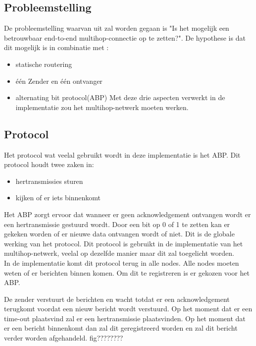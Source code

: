\documentclass{article}
\begin{document}
\subsection{Probleemstelling}
De probleemstelling waarvan uit zal worden gegaan is "Is het mogelijk een betrouwbaar end-to-end multihop-connectie op te zetten?". De hypothese is dat dit mogelijk is in combinatie met :
\\
\begin{itemize}
	\item statische routering
	\item \'{e}\'{e}n Zender en \'{e}\'{e}n ontvanger
	\item alternating bit protocol(ABP)
	Met deze drie aspecten verwerkt in de implementatie zou het multihop-netwerk moeten werken. 
\end{itemize}
\subsection{Protocol}
Het protocol wat veelal gebruikt wordt in deze implementatie is het ABP. Dit protocol houdt twee zaken in:
\\
\begin{itemize}
	\item hertransmissies sturen
	\item kijken of er iets binnenkomt
\end{itemize}
Het ABP zorgt ervoor dat wanneer er geen acknowledgement ontvangen wordt er een hertransmissie gestuurd wordt. Door een bit op 0 of 1 te zetten kan er gekeken worden of er nieuwe data ontvangen wordt of niet. Dit is de globale werking van het protocol. Dit protocol is gebruikt in de implementatie van het multihop-netwerk, veelal op dezelfde manier maar dit zal toegelicht worden. 
\\ 
In de implementatie komt dit protocol terug in alle nodes.
Alle nodes moeten weten of er berichten binnen komen. Om dit te registreren is er gekozen voor het ABP.

De zender verstuurt de berichten en wacht totdat er een acknowledgement terugkomt voordat een nieuw bericht wordt verstuurd. Op het moment dat er een time-out plaatsvind zal er een hertransmissie plaatsvinden. Op het moment dat er een bericht binnenkomt dan zal dit geregistreerd worden en zal dit bericht verder worden afgehandeld. fig????????
\end{document}
